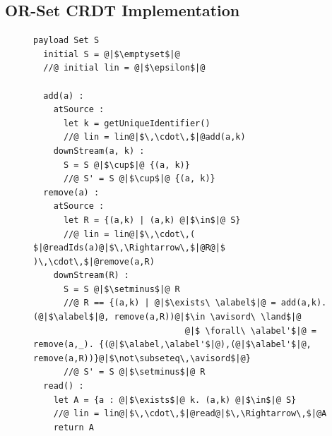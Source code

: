 

\subsection{OR-Set CRDT Implementation}
\label{sec:or-set-crdt}


\begin{figure}[!t]
  \centering
\begin{lstlisting}[caption={\vspace{-1mm}Pseudo-code of the OR-Set CRDT.},basicstyle=\ttfamily\scriptsize,captionpos=b,label={lst:or-set}]
  payload Set S
  initial S = @|$\emptyset$|@
  //@ initial lin = @|$\epsilon$|@

  add(a) :
    atSource :
      let k = getUniqueIdentifier()
      //@ lin = lin@|$\,\cdot\,$|@add(a,k)
    downStream(a, k) :
      S = S @|$\cup$|@ {(a, k)}
      //@ S' = S @|$\cup$|@ {(a, k)}
  remove(a) :
    atSource :
      let R = {(a,k) | (a,k) @|$\in$|@ S}
      //@ lin = lin@|$\,\cdot\,( $|@readIds(a)@|$\,\Rightarrow\,$|@R@|$ )\,\cdot\,$|@remove(a,R)
    downStream(R) :
      S = S @|$\setminus$|@ R
      //@ R == {(a,k) | @|$\exists\ \alabel$|@ = add(a,k). (@|$\alabel$|@, remove(a,R))@|$\in \avisord\ \land$|@
                              @|$ \forall\ \alabel'$|@ = remove(a,_). {(@|$\alabel,\alabel'$|@),(@|$\alabel'$|@, remove(a,R))}@|$\not\subseteq\,\avisord$|@}
      //@ S' = S @|$\setminus$|@ R
  read() :
    let A = {a : @|$\exists$|@ k. (a,k) @|$\in$|@ S}
    //@ lin = lin@|$\,\cdot\,$|@read@|$\,\Rightarrow\,$|@A
    return A
\end{lstlisting}
\vspace{-5mm}
\end{figure}

